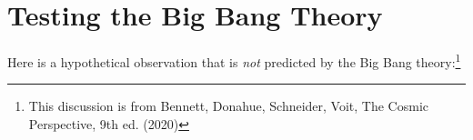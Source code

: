 %
%
%	
%	
%	
%

\section{Testing the Big Bang Theory}

Here is a hypothetical observation that is \textit{not} predicted by the Big Bang theory:\footnote{This discussion is from Bennett, Donahue, Schneider, Voit, The Cosmic Perspective, 9th ed. (2020)}

